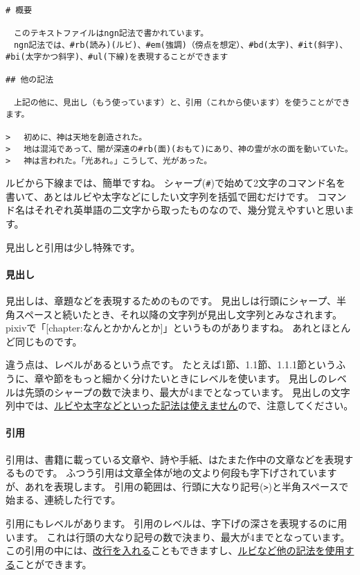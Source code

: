 \documentclass[a4j]{jsarticle}
\begin{document}
\begin{lstlisting}[caption=ngn記法]
# 概要

　このテキストファイルはngn記法で書かれています。
　ngn記法では、#rb(読み)(ルビ)、#em(強調)（傍点を想定）、#bd(太字)、#it(斜字)、#bi(太字かつ斜字)、#ul(下線)を表現することができます

## 他の記法

　上記の他に、見出し（もう使っています）と、引用（これから使います）を使うことができます。

> 　初めに、神は天地を創造された。
> 　地は混沌であって、闇が深遠の#rb(面)(おもて)にあり、神の霊が水の面を動いていた。
> 　神は言われた。「光あれ。」こうして、光があった。

\end{lstlisting}

ルビから下線までは、簡単ですね。
シャープ(\verb|#|)で始めて2文字のコマンド名を書いて、あとはルビや太字などにしたい文字列を括弧で囲むだけです。
コマンド名はそれぞれ英単語の二文字から取ったものなので、幾分覚えやすいと思います。

見出しと引用は少し特殊です。

\paragraph{見出し}

見出しは、章題などを表現するためのものです。
見出しは行頭にシャープ、半角スペースと続いたとき、それ以降の文字列が見出し文字列とみなされます。
pixivで「[chapter:なんとかかんとか]」というものがありますね。
あれとほとんど同じものです。

違う点は、レベルがあるという点です。
たとえば1節、1.1節、1.1.1節というふうに、章や節をもっと細かく分けたいときにレベルを使います。
見出しのレベルは先頭のシャープの数で決まり、最大が4までとなっています。
見出しの文字列中では、\underline{ルビや太字などといった記法は使えません}ので、注意してください。

\paragraph{引用}

引用は、書籍に載っている文章や、詩や手紙、はたまた作中の文章などを表現するものです。
ふつう引用は文章全体が地の文より何段も字下げされていますが、あれを表現します。
引用の範囲は、行頭に大なり記号(\verb|>|)と半角スペースで始まる、連続した行です。

引用にもレベルがあります。
引用のレベルは、字下げの深さを表現するのに用います。
これは行頭の大なり記号の数で決まり、最大が4までとなっています。
この引用の中には、\underline{改行を入れる}こともできますし、\underline{ルビなど他の記法を使用する}ことができます。
\end{document}
